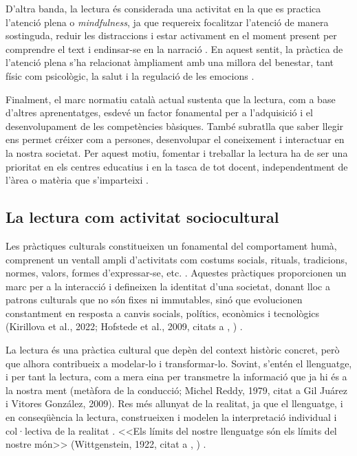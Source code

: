 \documentclass[12pt]{article}
\newcommand{\nestedparencite}[3]{%
  (#1, #2, citat a \citeauthor{#3}, \citeyear{#3})%
}
\newcommand{\nesteddoubleparencite}[5]{%
  (#1, #2; #3, #4, citats a \citeauthor{#5}, \citeyear{#5})%
}
\begin{document}
D'altra banda, la lectura és considerada una activitat en la que es practica l’atenció plena o \emph{mindfulness}, ja que requereix focalitzar l’atenció de manera sostinguda, reduir les distraccions i estar activament en el moment present per comprendre el text i endinsar-se en la narració \parencite{gorsy}. En aquest sentit, la pràctica de l'atenció plena s’ha relacionat àmpliament amb una millora del benestar, tant físic com psicològic, la salut i la regulació de les emocions \parencite{baena}.

Finalment, el marc normatiu català actual sustenta que la lectura, com a base d’altres aprenentatges, esdevé un factor fonamental per a l’adquisició i el desenvolupament de les competències bàsiques. També subratlla que saber llegir ens permet créixer com a persones, desenvolupar el coneixement i interactuar en la nostra societat. Per aquest motiu, fomentar i treballar la lectura ha de ser una prioritat en els centres educatius i en la tasca de tot docent, independentment de l'àrea o matèria que s'imparteixi \parencite{generalitatPLEC}.

\subsection{La lectura com activitat sociocultural}

Les pràctiques culturals constitueixen un fonamental del comportament humà, comprenent un ventall ampli d'activitats com costums socials, rituals, tradicions, normes, valors, formes d'expressar-se, etc. \parencite{shutaleva}. Aquestes pràctiques proporcionen un marc per a la interacció i defineixen la identitat d'una societat, donant lloc a patrons culturals que no són fixes ni immutables, sinó que evolucionen constantment en resposta a canvis socials, polítics, econòmics i tecnològics \nesteddoubleparencite{Kirillova et al.}{2022}{Hofstede et al.}{2009}{shutaleva}.

La lectura és una pràctica cultural que depèn del context històric concret, però que alhora contribueix a modelar-lo i transformar-lo. Sovint, s'entén el llenguatge, i per tant la lectura, com a mera eina per transmetre la informació que ja hi és a la nostra ment (metàfora de la conducció; Michel Reddy, 1979, citat a Gil Juárez i Vitores González, 2009). Res més allunyat de la realitat, ja que el llenguatge, i en conseqüència la lectura, construeixen i modelen la interpretació individual i col·lectiva de la realitat \parencite{gil_comu}. <<Els límits del nostre llenguatge són els límits del nostre món>> \nestedparencite{Wittgenstein}{1922}{lanza_wittgenstein}.
\end{document}
